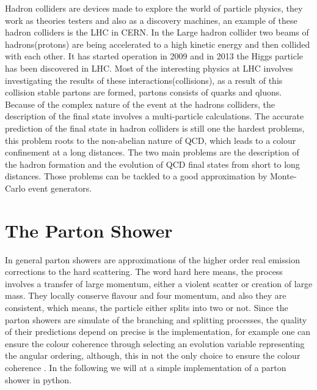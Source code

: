 Hadron colliders are devices made to explore the world of particle physics, they work as theories testers and also as a discovery machines, an example of these hadron colliders is the LHC in CERN. In the Large hadron collider
two beams of hadrons(protons)
are being accelerated to a high kinetic energy and then collided with each other. It has started operation in 2009 and in 2013 the Higgs particle has been discovered in LHC. Most of the interesting physics at LHC involves investigating the results of these interactions(collisions), as a result of this collision stable partons are formed, partons consists of quarks and qluons. Because of the complex nature of the event at the hadrons colliders, the description of the final state involves a multi-particle calculations. The accurate prediction of the final state in hadron colliders is still one the hardest problems, this problem roots to the non-abelian nature of QCD, which leads to a colour confinement at a long distances. The two main problems are the description of the hadron formation and the evolution of QCD final states from short to long distances. Those problems can be tackled to a good approximation by Monte-Carlo event generators.


\section{The Parton Shower}
In general parton showers are approximations of the higher order real emission corrections to the hard scattering. The word hard here means,
the process involves a transfer of large momentum, either a violent scatter or creation of large mass. They locally conserve flavour and four momentum, and also they are consistent, which means, the particle either splits into two or not. 
Since the parton showers are simulate of the branching and splitting processes, the quality of their predictions depend on precise is the implementation, for example one can ensure the colour coherence through selecting an evolution variable representing the angular ordering, although, this in not the only choice to ensure the colour coherence \citep{introduction}.
In the following we will at a simple implementation of a parton shower in python.

